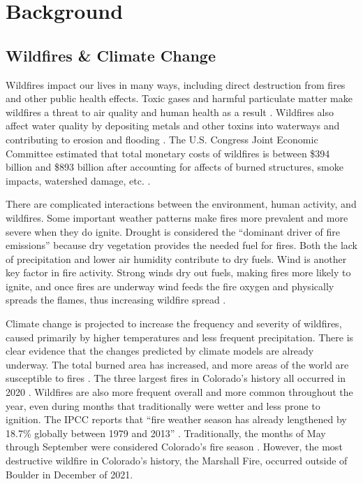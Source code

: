 \documentclass[11pt]{article}%
\begin{document}
\newpage
\tableofcontents
\newpage

\section{Background}
\subsection{Wildfires \& Climate Change}

Wildfires impact our lives in many ways, including direct destruction from fires and other public health effects. Toxic gases and harmful particulate matter make wildfires a threat to air quality and human health as a result \cite{WHO-2024-WFS}. Wildfires also affect water quality by depositing metals and other toxins into waterways and contributing to erosion and flooding \cite{USGS-2024-WQA}. The U.S. Congress Joint Economic Committee estimated that total monetary costs of wildfires is between \$394 billion and \$893 billion after accounting for affects of burned structures, smoke impacts, watershed damage, etc. \cite{JEC-2023-CEW}.

There are complicated interactions between the environment, human activity, and wildfires. Some important weather patterns make fires more prevalent and more severe when they do ignite. Drought is considered the “dominant driver of fire emissions” \cite{IPCC-2021-LCI} because dry vegetation provides the needed fuel for fires. Both the lack of precipitation and lower air humidity contribute to dry fuels. Wind is another key factor in fire activity. Strong winds dry out fuels, making fires more likely to ignite, and once fires are underway wind feeds the fire oxygen and physically spreads the flames, thus increasing wildfire spread \cite{Richardson-2022-GIW}.

Climate change is projected to increase the frequency and severity of wildfires, caused primarily by higher temperatures and less frequent precipitation. There is clear evidence that the changes predicted by climate models are already underway. The total burned area has increased, and more areas of the world are susceptible to fires \cite{IPCC-2021-LCI}. The three largest fires in Colorado’s history all occurred in 2020 \cite{CDFPC-2024-HWI}. Wildfires are also more frequent overall and more common throughout the year, even during months that traditionally were wetter and less prone to ignition. The IPCC  reports that “fire weather season has already lengthened by 18.7\% globally between 1979 and 2013” \cite{IPCC-2021-LCI}. Traditionally, the months of May through September were considered Colorado’s fire season \cite{WFCA-2023-CFS}. However, the most destructive wildfire in Colorado’s history, the Marshall Fire, occurred outside of Boulder in December of 2021. \cite{CDFPC-2024-HWI} 
\end{document}

